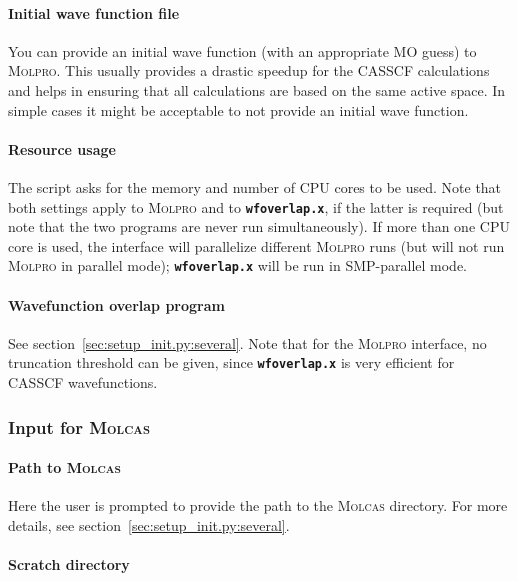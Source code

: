 \documentclass[a4paper,10pt,DIV=15,openany,twoside=false]{scrbook}
\newcommand{\ttt}[1]{\textbf{\texttt{#1}}}
\begin{document}
\paragraph{Initial wave function file}

You can provide an initial wave function (with an appropriate MO guess) to \textsc{Molpro}. This usually provides a drastic speedup for the CASSCF calculations and helps in ensuring that all calculations are based on the same active space. In simple cases it might be acceptable to not provide an initial wave function.

\paragraph{Resource usage}

The script asks for the memory and number of CPU cores to be used. Note that both settings apply to \textsc{Molpro} and to \ttt{wfoverlap.x}, if the latter is required (but note that the two programs are never run simultaneously).
If more than one CPU core is used, the interface will parallelize different \textsc{Molpro} runs (but will not run \textsc{Molpro} in parallel mode); \ttt{wfoverlap.x} will be run in SMP-parallel mode.

\paragraph{Wavefunction overlap program}

See section~\ref{sec:setup_init.py:several}. Note that for the \textsc{Molpro} interface, no truncation threshold can be given, since \ttt{wfoverlap.x} is very efficient for CASSCF wavefunctions.

\subsubsection{Input for \textsc{Molcas}}\label{sec:setup_init.py:molcas}

\paragraph{Path to \textsc{Molcas}}

Here the user is prompted to provide the path to the \textsc{Molcas} directory. 
For more details, see section~\ref{sec:setup_init.py:several}.

\paragraph{Scratch directory}
\end{document}
